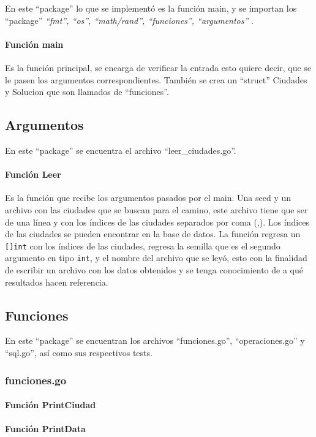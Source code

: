 \documentclass[
10pt,
a4paper,
oneside,
headinclude,footinclude,
BCOR5mm,
]{article}
\begin{document}
En este ``package'' lo que se implementó es la función main, y se importan los
``package'' \textit{``fmt'', ``os'', ``math/rand'', ``funciones'', ``argumentos''
}.

\paragraph{Función main} Es la función principal, se encarga de verificar la
entrada esto quiere decir, que se le pasen los argumentos correspondientes.
También se crea un ``struct'' Ciudades y Solucion que son llamados de
``funciones''.

\subsection{Argumentos}
En este ``package'' se encuentra el archivo ``leer\_ciudades.go''.
\paragraph{Función Leer} Es la función que recibe los argumentos pasados por el
main. Una seed y un archivo con las ciudades que se buscan para el camino, este
archivo tiene que ser de una línea y con los índices de las ciudades separados
por coma (,). Los índices de las ciudades se pueden encontrar en la base de
datos. La función regresa un \texttt{[]int} con los índices
de las ciudades, regresa la semilla que es el segundo argumento en tipo
\texttt{int}, y el nombre del archivo que se leyó, esto con la finalidad de
escribir un archivo con los datos obtenidos y se tenga conocimiento de a qué
resultados hacen referencia.

\subsection{Funciones}
En este ``package'' se encuentran los archivos ``funciones.go'',
``operaciones.go'' y ``sql.go'', así como sus respectivos tests.

\subsubsection{funciones.go}

\paragraph{Función PrintCiudad}
\paragraph{Función PrintData}
\end{document}

